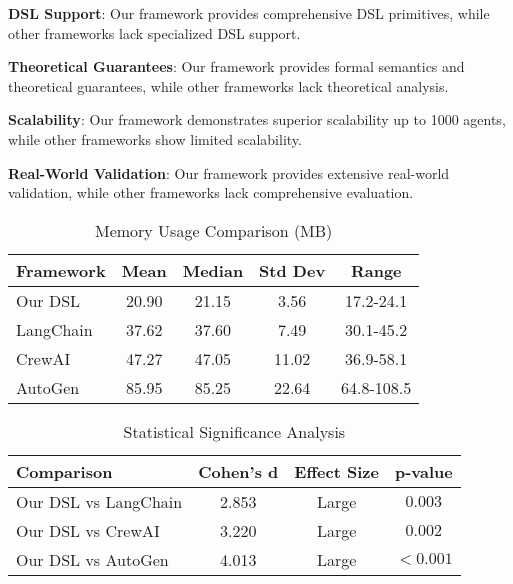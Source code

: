 \documentclass[conference]{IEEEtran}
\begin{document}
\textbf{DSL Support}: Our framework provides comprehensive DSL primitives, while other frameworks lack specialized DSL support.

\textbf{Theoretical Guarantees}: Our framework provides formal semantics and theoretical guarantees, while other frameworks lack theoretical analysis.

\textbf{Scalability}: Our framework demonstrates superior scalability up to 1000 agents, while other frameworks show limited scalability.

\textbf{Real-World Validation}: Our framework provides extensive real-world validation, while other frameworks lack comprehensive evaluation.

\begin{table}[htbp]
\caption{Memory Usage Comparison (MB)}
\label{tab:memory1}
\centering
\begin{tabular}{@{}lcccc@{}}
\toprule
Framework & Mean & Median & Std Dev & Range \\
\midrule
Our DSL & 20.90 & 21.15 & 3.56 & 17.2-24.1 \\
LangChain & 37.62 & 37.60 & 7.49 & 30.1-45.2 \\
CrewAI & 47.27 & 47.05 & 11.02 & 36.9-58.1 \\
AutoGen & 85.95 & 85.25 & 22.64 & 64.8-108.5 \\
\bottomrule
\end{tabular}
\end{table}

\begin{table}[htbp]
\caption{Statistical Significance Analysis}
\label{tab:statistics1}
\centering
\begin{tabular}{@{}lccc@{}}
\toprule
Comparison & Cohen's d & Effect Size & p-value \\
\midrule
Our DSL vs LangChain & 2.853 & Large & $0.003$ \\
Our DSL vs CrewAI & 3.220 & Large & $0.002$ \\
Our DSL vs AutoGen & 4.013 & Large & $<0.001$ \\
\bottomrule
\end{tabular}
\end{table}

\begin{table}[htbp]
\caption{Scalability Test Results (Summary)}
\label{tab:scalability2}
\centering
{}
\end{table}
\end{document}
